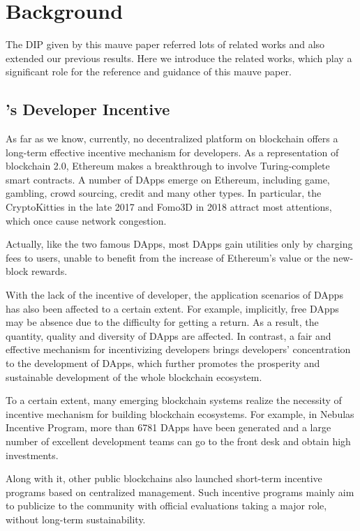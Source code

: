 \section{Background}
\label{sec:background}
\noindent
The DIP given by this mauve paper referred  lots of related works and also extended our previous results. Here we introduce the related works, which play a significant role for the  reference and guidance of this mauve paper.

\subsection{\dapp's Developer Incentive}
\noindent
As far as we know, currently, no decentralized platform on blockchain offers a
long-term effective incentive mechanism for \dapp developers. As a
representation of blockchain 2.0, Ethereum makes a breakthrough to involve
Turing-complete smart contracts. A number of DApps emerge on Ethereum,
including game, gambling, crowd sourcing, credit and many other types. In
particular, the CryptoKitties in the late 2017 and Fomo3D in 2018 attract most
attentions, which once cause network congestion.

Actually, like the two famous DApps, most DApps gain utilities only by charging
fees to users, unable to benefit from the increase of Ethereum's value or the
new-block rewards.

With the lack of the incentive of developer, the application scenarios of DApps
has also been affected to a certain extent. For example, implicitly, free DApps
may be absence due to the difficulty for getting a return. As a result, the
quantity, quality and diversity of DApps are affected. In contrast, a fair and
effective mechanism for incentivizing developers brings developers'
concentration to the development of DApps, which further promotes the prosperity and sustainable development of the whole blockchain ecosystem.

To a certain extent, many emerging blockchain systems realize the necessity of incentive mechanism for building blockchain ecosystems. For example, in Nebulas Incentive Program, more than 6781 DApps have been generated and a large number of excellent development teams can go to the front desk and obtain high investments.

Along with it, other public blockchains also launched short-term incentive programs based on centralized management. Such incentive programs mainly aim to publicize to the community with official evaluations taking a major role, without long-term sustainability.


